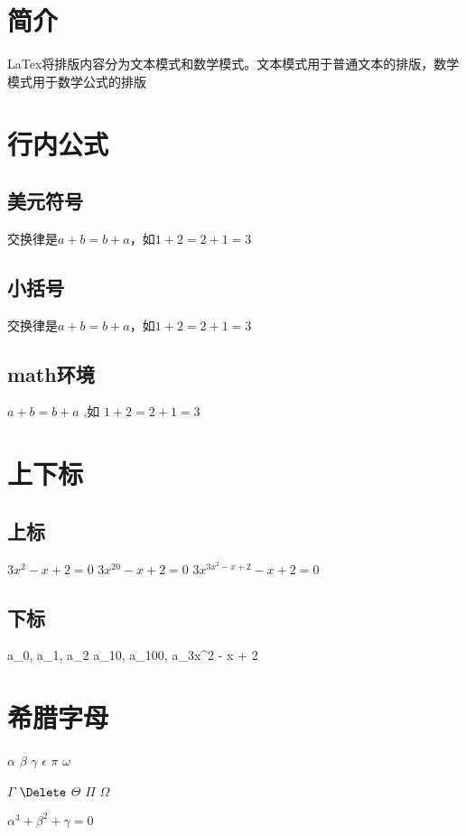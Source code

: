 \documentclass{ctexart}
\begin{document}
	\section{简介}
	LaTex将排版内容分为文本模式和数学模式。文本模式用于普通文本的排版，数学模式用于数学公式的排版
	\section{行内公式}
	\subsection{美元符号}
		交换律是$a+b=b+a$，如\(1+2=2+1=3\)
	\subsection{小括号}
		交换律是\(a+b=b+a\)，如\(1+2=2+1=3\)
	\subsection{math环境}
		\begin{math}
			a+b=b+a
		\end{math}
		,如
		\begin{math}
			1+2=2+1=3
		\end{math}
	\section{上下标}
	\subsection{上标}
		$3x^2 - x + 2 = 0$
		$3x^{20} - x + 2 = 0$
		$3x^{3x^2 - x + 2} - x + 2 = 0$
	\subsection{下标}
		a_0, a_1, a_2
		a_{10}, a_{100}, a_{3x^2 - x + 2}
	\section{希腊字母}
		$\alpha$
		$\beta$
		$\gamma$
		$\epsilon$
		$\pi$
		$\omega$

		$\Gamma$
		$\Delete$
		$\Theta$
		$\Pi$
		$\Omega$

		$\alpha^3 + \beta^2 + \gamma = 0$
\end{document}
